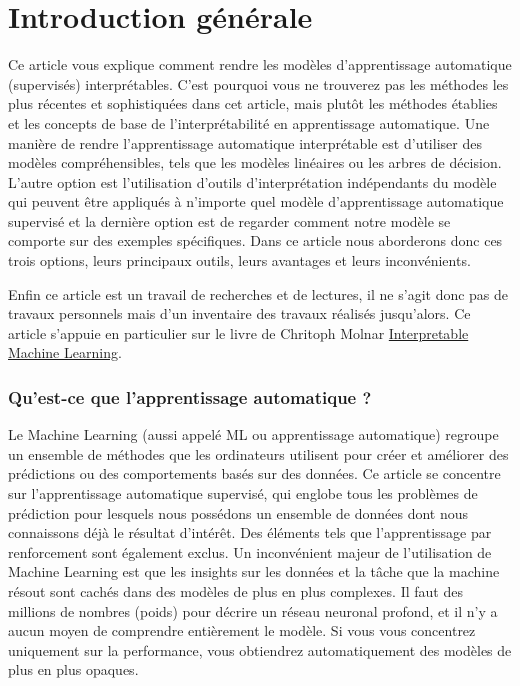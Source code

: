\section*{Introduction générale}

Ce article vous explique comment rendre les modèles d'apprentissage automatique (supervisés) interprétables. C'est pourquoi vous ne trouverez pas les méthodes les plus récentes et sophistiquées dans cet article, mais plutôt les méthodes établies et les concepts de base de l'interprétabilité en apprentissage automatique. Une manière de rendre l'apprentissage automatique interprétable est d'utiliser des modèles compréhensibles, tels que les modèles linéaires ou les arbres de décision. L'autre option est l'utilisation d'outils d'interprétation indépendants du modèle qui peuvent être appliqués à n'importe quel modèle d'apprentissage automatique supervisé et la dernière option est de regarder comment notre modèle se comporte sur des exemples spécifiques. Dans ce article nous aborderons donc ces trois options, leurs principaux outils, leurs avantages et leurs inconvénients. 

Enfin ce article est un travail de recherches et de lectures, il ne s'agit donc pas de travaux personnels mais d'un inventaire des travaux réalisés jusqu'alors. Ce article s'appuie en particulier sur le livre de Chritoph Molnar \hyperlink{https://christophm.github.io/interpretable-ml-book/}{ Interpretable Machine Learning}.
 
\subsubsection*{Qu'est-ce que l'apprentissage automatique ?}

Le Machine Learning (aussi appelé ML ou apprentissage automatique) regroupe un ensemble de méthodes que les ordinateurs utilisent pour créer et améliorer des prédictions ou des comportements basés sur des données. Ce article se concentre sur l'apprentissage automatique supervisé, qui englobe tous les problèmes de prédiction pour lesquels nous possédons un ensemble de données dont nous connaissons déjà le résultat d'intérêt. Des éléments tels que l'apprentissage par renforcement sont également exclus. Un inconvénient majeur de l'utilisation de Machine Learning est que les insights sur les données et la tâche que la machine résout sont cachés dans des modèles de plus en plus complexes. Il faut des millions de nombres (poids) pour décrire un réseau neuronal profond, et il n'y a aucun moyen de comprendre entièrement le modèle. Si vous vous concentrez uniquement sur la performance, vous obtiendrez automatiquement des modèles de plus en plus opaques.









